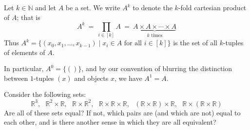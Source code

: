 
\begin{notation}
\label{ntnKFoldCartesianProduct}
Let $k \in \mathbb{N}$ and let $A$ be a set. We write $A^k$ to denote the $k$-fold cartesian product of $A$; that is
\[ A^k ~=~ \prod_{i \in [k]} A ~=~ \underbrace{A \times A \times \cdots \times A}_{k \text{ times}} \]
Thus $A^k = \{ (x_0,x_1,\dots,x_{k-1}) \mid x_i \in A \text{ for all } i \in [k] \}$ is the set of all $k$-tuples of elements of $A$.

In particular, $A^0 = \{ () \}$, and by our convention of blurring the distinction between $1$-tuples $(x)$ and objects $x$, we have $A^1 = A$.
\end{notation}


\begin{exercise}
Consider the following sets:
\[ \mathbb{R}^3, ~~~ \mathbb{R}^2 \times \mathbb{R}, ~~~ \mathbb{R} \times \mathbb{R}^2, ~~~ \mathbb{R} \times \mathbb{R} \times \mathbb{R}, ~~~ (\mathbb{R} \times \mathbb{R}) \times \mathbb{R}, ~~~ \mathbb{R} \times (\mathbb{R} \times \mathbb{R}) \]
Are all of these sets equal? If not, which pairs are (and which are not) equal to each other, and is there another sense in which they are all equivalent?
\end{exercise}



